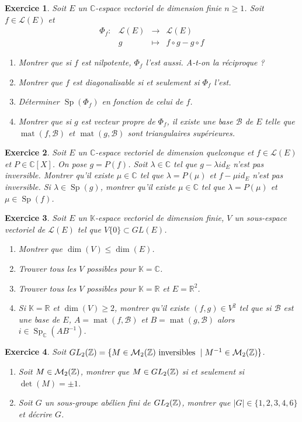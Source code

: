 \documentclass[12pt]{article}
\newtheorem{exercise}{Exercice}[section]
\theoremstyle{remark}
\theoremstyle{remark}
\newcommand{\K}{\mathbb{K}} \newcommand{\R}{\mathbb{R}}
\newcommand{\C}{\mathbb{C}} \newcommand{\Q}{\mathbb{Q}}
\newcommand{\M}{\mathcal{M}} \renewcommand{\L}{\mathcal{L}}
\DeclareMathOperator{\Sp}{Sp} \DeclareMathOperator{\mat}{mat}
\newcommand{\function}[5]{
	$$
	\begin{array}{rccl}
		#1: & #2 & \to & #3 \\
		& #4 & \mapsto & #5
	\end{array}
	$$
}
\begin{document}
\begin{exercise}
	Soit $E$ un $\C$-espace vectoriel de dimension finie $n\geqslant1$. Soit $f\in\L(E)$ et \function{\Phi_f}{\L(E)}{\L(E)}{g}{f\circ g-g\circ f}
	\begin{enumerate}
		\item Montrer que si $f$ est nilpotente, $\Phi_{f}$ l'est aussi. A-t-on la réciproque ?
		\item Montrer que $f$ est diagonalisable si et seulement si $\Phi_{f}$ l'est.
		\item Déterminer $\Sp(\Phi_{f})$ en fonction de celui de $f$.
		\item Montrer que si $g$ est vecteur propre de $\Phi_{f}$, il existe une base $\mathcal{B}$ de $E$ telle que $\mat(f,\mathcal{B})$ et $\mat(g,\mathcal{B})$ sont triangulaires supérieures.
	\end{enumerate}
\end{exercise}

\begin{exercise}
	Soit $E$ un $\C$-espace vectoriel de dimension quelconque et $f\in\L(E)$ et $P\in\C[X]$. On pose $g=P(f)$. Soit $\lambda\in\C$ tel que $g-\lambda id_{E}$ n'est pas inversible. Montrer qu'il existe $\mu\in\C$ tel que $\lambda=P(\mu)$ et $f-\mu id_{E}$ n'est pas inversible. Si $\lambda\in\Sp(g)$, montrer qu'il existe $\mu\in\C$ tel que $\lambda=P(\mu)$ et $\mu\in\Sp(f)$.
\end{exercise}

\begin{exercise}
	Soit $E$ un $\K$-espace vectoriel de dimension finie, $V$ un sous-espace vectoriel de $\L(E)$ tel que $V\{0\}\subset GL(E)$.
	\begin{enumerate}
		\item Montrer que $\dim(V)\leqslant\dim(E)$.
		\item Trouver tous les $V$ possibles pour $\K=\C$.
		\item Trouver tous les $V$ possibles pour $\K=\R$ et $E=\R^{2}$.
		\item Si $\K=\R$ et $\dim(V)\geqslant2$, montrer qu'il existe $(f,g)\in V^{2}$ tel que si $\mathcal{B}$ est une base de $E$, $A=\mat(f,\mathcal{B})$ et $B=\mat(g,\mathcal{B})$ alors $i\in\Sp_{\C}(AB^{-1})$.
	\end{enumerate}
\end{exercise}

\begin{exercise}
	Soit $GL_{2}(\Z)=\{M\in\M_2(\Z)\text{ inversibles }\mid M^{-1}\in\M_{2}(\Z)\}$.
	\begin{enumerate}
		\item Soit $M\in\M_{2}(\Z)$, montrer que $M\in GL_{2}(\mathbb{Z})$ si et seulement si $\det(M)=\pm1$.
		\item Soit $G$ un sous-groupe abélien fini de $GL_{2}(\mathbb{Z})$, montrer que $\vert G\vert\in\{1,2,3,4,6\}$ et décrire $G$.
	\end{enumerate}
\end{exercise}
\end{document}
